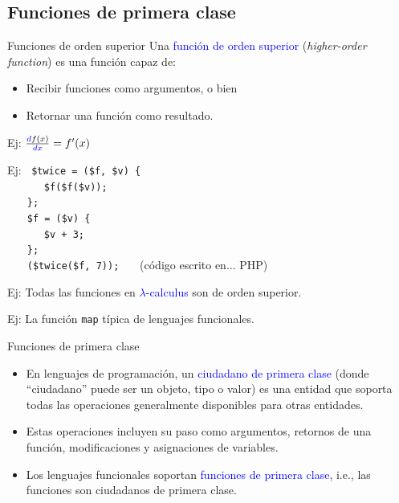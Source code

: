 \documentclass{beamer} %
\newcommand{\blue}[1]{\textcolor{blue}{#1}}
\newcommand{\green}[1]{{\color{green!70!black}{#1}}}
\newcommand{\gray}[1]{{\color{gray!50!white}{#1}}}
\begin{document}
\subsection{Funciones de primera clase}

\begin{frame}{Funciones de orden superior}
    Una \blue{función de orden superior} ({\em higher-order function}) es una función capaz de:
    \begin{itemize}
        \item Recibir funciones como argumentos, o bien
        \item Retornar una función como resultado.
    \end{itemize}
    \medskip\pause
    
    Ej: \pause $\frac{\blue{d}f(x)}{\blue{dx}}=f'(x)$
    \medskip\pause
    
    Ej:
    \footnotesize{
    $~$ \texttt{\$twice = \green{function}(\$f, \$v) \{}\\
    $~~~~~~~~~~~$ \texttt{\green{return} \$f(\$f(\$v));}\\
    $~~~~~~~~$\texttt{\};}\\
    $~~~~~~~~$\texttt{\$f = \green{function}(\$v) \{}\\
    $~~~~~~~~~~~$ \texttt{\green{return} \$v + 3;}\\
    $~~~~~~~~$\texttt{\};}\\
    $~~~~~~~~$\texttt{\green{echo}(\$twice(\$f, 7)); \gray{// 13}}
    $~~~$ (código escrito en... \pause PHP)
    }\medskip\pause
    
    Ej: Todas las funciones en \blue{$\lambda$-calculus} son de orden superior.
    \medskip\pause
    
    Ej: La función \texttt{map} típica de lenguajes funcionales.
\end{frame}

\begin{frame}{Funciones de primera clase}
    \begin{itemize}
        \item<1-> En lenguajes de programación, un \blue{ciudadano de primera clase} (donde ``ciudadano'' puede ser un objeto, tipo o valor) es una entidad que soporta todas las operaciones generalmente disponibles para otras entidades.
        \item<2-> Estas operaciones incluyen su paso como argumentos, retornos de una función, modificaciones y asignaciones de variables.
        \item<3-> Los lenguajes funcionales soportan \blue{funciones de primera clase}, i.e., las funciones son ciudadanos de primera clase.
    \end{itemize}
    \medskip
    
\end{frame}
\end{document}
